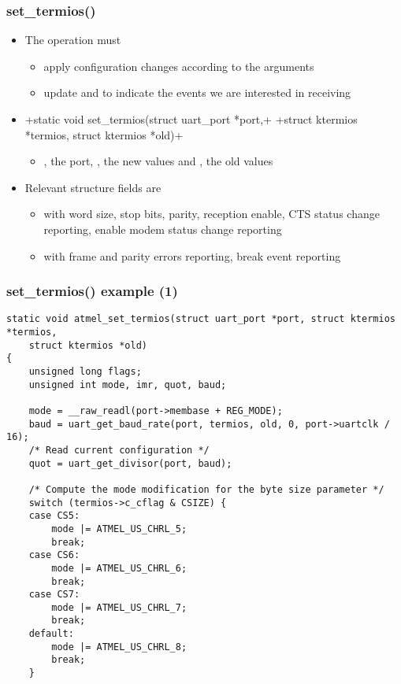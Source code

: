 \begin{frame}[fragile]
  \frametitle{set\_termios()}
  \begin{itemize}
  \item The  operation must
    \begin{itemize}
    \item apply configuration changes according to the arguments
    \item update  and
       to indicate the events we are
      interested in receiving
    \end{itemize}
  \item {}+static void set_termios(struct uart_port *port,+
    +struct ktermios *termios, struct ktermios *old)+
    \begin{itemize}
    \item {}, the port, , the new values and
      , the old values
    \end{itemize}
  \item Relevant  structure fields are
    \begin{itemize}
    \item {} with word size, stop bits, parity, reception
      enable, CTS status change reporting, enable modem status change
      reporting
    \item {} with frame and parity errors reporting, break
      event reporting
    \end{itemize}
  \end{itemize}
\end{frame}

\begin{frame}[fragile]
  \frametitle{set\_termios() example (1)}
\begin{verbatim}
static void atmel_set_termios(struct uart_port *port, struct ktermios *termios,
    struct ktermios *old)
{
    unsigned long flags;
    unsigned int mode, imr, quot, baud;

    mode = __raw_readl(port->membase + REG_MODE);
    baud = uart_get_baud_rate(port, termios, old, 0, port->uartclk / 16);
    /* Read current configuration */
    quot = uart_get_divisor(port, baud);

    /* Compute the mode modification for the byte size parameter */
    switch (termios->c_cflag & CSIZE) {
    case CS5:
        mode |= ATMEL_US_CHRL_5;
        break;
    case CS6:
        mode |= ATMEL_US_CHRL_6;
        break;
    case CS7:
        mode |= ATMEL_US_CHRL_7;
        break;
    default:
        mode |= ATMEL_US_CHRL_8;
        break;
    }
\end{verbatim}
\end{frame}

